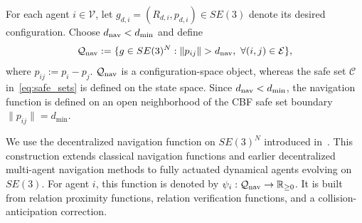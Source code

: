 \documentclass[journal,twoside,web]{ieeecolor}
\begin{document}
For each agent $i\in\mathcal V$, let
$g_{d,i}=(R_{d,i},p_{d,i})\in SE(3)$ denote its desired
configuration. %
Choose \(d_{\rm nav}<d_{\min}\) and define
\[
\mathcal Q_{\rm nav}:=
\{g\in SE(3)^N:\|p_{ij}\|>d_{\rm nav},
\ \forall(i,j)\in\mathcal E\},
\]
where \(p_{ij}:=p_i-p_j\). \(\mathcal Q_{\rm nav}\) is a
configuration-space object, whereas the safe set \(\mathcal C\)
in~\eqref{eq:safe_sets} is defined on the state space. Since
\(d_{\rm nav}<d_{\min}\), the navigation function is defined on an
open neighborhood of the CBF safe set boundary
\(\|p_{ij}\|=d_{\min}\).%

We use the decentralized navigation function on $SE(3)^N$
introduced in~\cite{YagoNietoSimoesGiribetColombo2026DNFSE3Learning}.
This construction extends classical navigation functions
\cite{RimonKoditschek1992} and earlier decentralized
multi-agent navigation methods
\cite{DimarogonasKyriakopoulos2005} to fully actuated
dynamical agents evolving on $SE(3)$. For agent $i$, this
function is denoted by
$\psi_i:\mathcal Q_{\rm nav}\rightarrow\mathbb R_{\geq0}$.
It is built from relation proximity functions, relation
verification functions, and a collision-anticipation correction.
\end{document}
